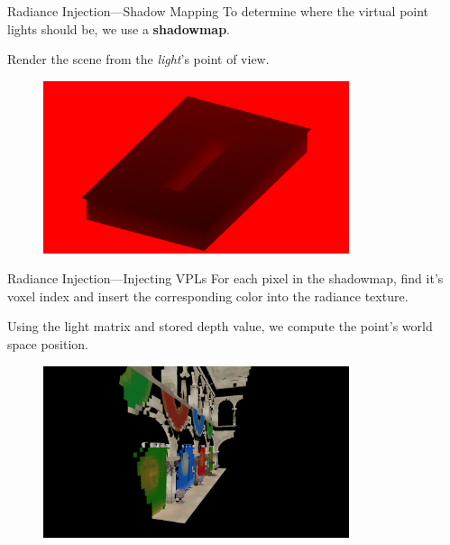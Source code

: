 \documentclass[10pt]{beamer}
\begin{document}
\begin{frame}{Radiance Injection---Shadow Mapping}
  To determine where the virtual point lights should be, we use a \textbf{shadowmap}.

  Render the scene from the \textit{light}'s point of view.


  \begin{figure}
    \includegraphics[width=0.8\textwidth]{shadowmap}
  \end{figure}
\end{frame}

\begin{frame}{Radiance Injection---Injecting VPLs}
  For each pixel in the shadowmap, find it's voxel index and insert the corresponding color into the radiance texture.

  Using the light matrix and stored depth value, we compute the point's world space position.

  \begin{figure}
    \includegraphics[width=0.8\textwidth]{radiance_nolighting}
  \end{figure}
\end{frame}
\end{document}
